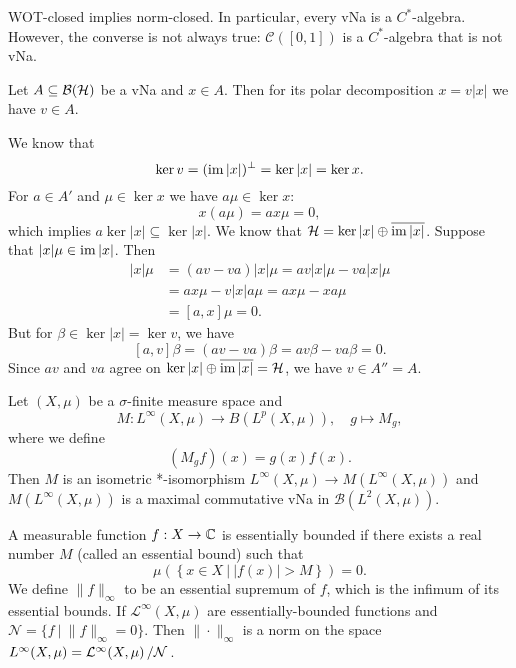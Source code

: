 \begin{remark}
  WOT-closed implies norm-closed. In particular, every vNa is a $C^*$-algebra.
  However, the converse is not always true: $\mathcal{C} ([0, 1])$ is a $C^*$-algebra that is not vNa.
\end{remark}


\begin{corollary}
  Let $A \subseteq \operatorname{\mathcal{B} (\mathcal{H})}$ be a vNa and $x \in A$.
  Then for its polar decomposition $x = v|x|$ we have $v \in A$.
\end{corollary}

\begin{myproof}
  We know that 
  $$\ker v = (\operatorname{im} |x|)^\perp = \ker |x| = \ker x.$$
  For $a \in A'$ and $\mu \in \ker x$ we have $a\mu \in \ker x$:
  $$x (a\mu) = a x\mu = 0,$$
  which implies $a \ker |x| \subseteq \ker |x|$.
  We know that $\mathcal{H} = \ker |x| \oplus \overline{\operatorname{im} |x|}$.
  Suppose that $|x| \mu \in \operatorname{im} |x|$. Then 
  \begin{align*}
    [a, v] |x| \mu &= (av - va) |x| \mu = av |x| \mu - va |x| \mu\\
    &= ax\mu - v|x| a \mu = ax\mu - xa\mu \\
    &= [a, x]\mu = 0.
  \end{align*}
  But for $\beta \in \ker |x| = \ker v$, we have
  $$[a, v] \beta = (av - va)\beta = av\beta - va \beta = 0.$$
  Since $av$ and $va$ agree on $\ker |x| \oplus \overline{\operatorname{im} |x|}= \mathcal{H}$, we have $v \in A'' = A$.
\end{myproof}

\begin{example} \label{ex:1}
  Let $(X, \mu)$  be a $\sigma$-finite measure space and 
  $$M: L^\infty (X, \mu) \to B (L^p (X,\mu)),\quad g \mapsto M_g,$$
  where we define 
  $$(M_g f) (x) = g (x) f(x).$$
  Then $M$ is an isometric *-isomorphism $L^\infty (X, \mu) \to M(L^\infty (X, \mu))$
  and $M(L^\infty (X, \mu))$ is a maximal commutative vNa in $\mathcal{B} (L^2 (X, \mu))$.
\end{example}

\begin{remark}
  A measurable function $f: X \to \mathbb {C}$ is essentially bounded if there exists a real number $M$ (called an essential bound) such that 
  $$\mu \left(\left\lbrace x \in X\ |\ |f(x)| > M \right\rbrace\right) = 0.$$
  We define $\| f\|_{\infty}$ to be an essential supremum of $f$, which is the infimum of its essential bounds.
  If $\mathcal{L}^\infty (X, \mu)$ are essentially-bounded functions and $\mathcal{N} = \{f\ |\ \| f\|_\infty  = 0\}$.
  Then $\| \cdot \|_{\infty}$ is a norm on the space $L^\infty (X, \mu) = \quot{\mathcal{L}^\infty (X, \mu)}{\mathcal{N}}$.
\end{remark}

